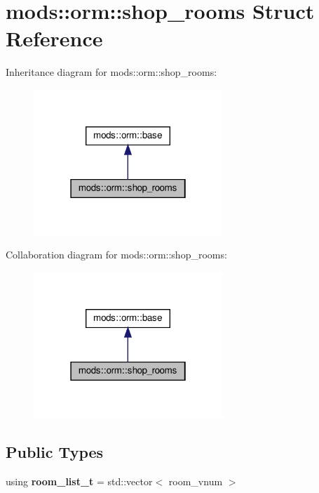 \hypertarget{structmods_1_1orm_1_1shop__rooms}{}\section{mods\+:\+:orm\+:\+:shop\+\_\+rooms Struct Reference}
\label{structmods_1_1orm_1_1shop__rooms}


Inheritance diagram for mods\+:\+:orm\+:\+:shop\+\_\+rooms\+:\nopagebreak
\begin{figure}[H]
\begin{center}
\leavevmode
\includegraphics[width=202pt]{structmods_1_1orm_1_1shop__rooms__inherit__graph}
\end{center}
\end{figure}


Collaboration diagram for mods\+:\+:orm\+:\+:shop\+\_\+rooms\+:\nopagebreak
\begin{figure}[H]
\begin{center}
\leavevmode
\includegraphics[width=202pt]{structmods_1_1orm_1_1shop__rooms__coll__graph}
\end{center}
\end{figure}
\subsection*{Public Types}
\begin{DoxyCompactItemize}
\item 
\mbox{\label{structmods_1_1orm_1_1shop__rooms_a2f9ceb086bcc4956f88938f859fc967f}} 
using {\bfseries room\+\_\+list\+\_\+t} = std\+::vector$<$ room\+\_\+vnum $>$
\end{DoxyCompactItemize}
